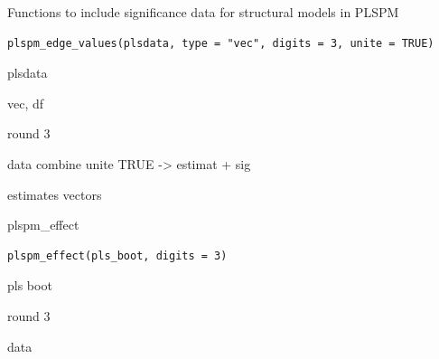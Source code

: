 \documentclass[a4paper]{book}
\begin{document}
%
\begin{Description}
Functions to include significance data for structural models in PLSPM
\end{Description}
%
\begin{Usage}
\begin{verbatim}
plspm_edge_values(plsdata, type = "vec", digits = 3, unite = TRUE)
\end{verbatim}
\end{Usage}
%
\begin{Arguments}
\begin{ldescription}
\item[\code{plsdata}] plsdata

\item[\code{type}] vec, df

\item[\code{digits}] round 3

\item[\code{unite}] data combine unite TRUE -> estimat + sig
\end{ldescription}
\end{Arguments}
%
\begin{Value}
estimates vectors
\end{Value}

%
\begin{Description}
plspm\_effect
\end{Description}
%
\begin{Usage}
\begin{verbatim}
plspm_effect(pls_boot, digits = 3)
\end{verbatim}
\end{Usage}
%
\begin{Arguments}
\begin{ldescription}
\item[\code{pls\_boot}] pls boot

\item[\code{digits}] round 3
\end{ldescription}
\end{Arguments}
%
\begin{Value}
data
\end{Value}
\end{document}
